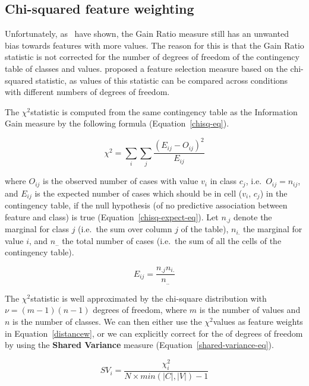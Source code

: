 \documentclass{report}
\newcommand{\chisq}{{$ \chi^2 $}}
\begin{document}
\subsection{Chi-squared feature weighting}
\label{chisquared}

Unfortunately, as~ have shown, the Gain Ratio measure
still has an unwanted bias towards features with more values. The
reason for this is that the Gain Ratio statistic is not corrected for
the number of degrees of freedom of the contingency table of classes
and values.  proposed a feature selection measure based
on the chi-squared statistic, as values of this statistic can be
compared across conditions with different numbers of degrees of
freedom.

The \chisq statistic is computed from the same contingency table as
the Information Gain measure by the following formula
(Equation~\ref{chisq-eq}).

\begin{equation} 
\chi^{2} = \sum_{i} \sum_{j} \frac{(E_{ij} - O_{ij})^{2}}
				  {E_{ij}} 
\label{chisq-eq}
\end{equation} 

where $O_{ij}$ is the observed number of cases with value $v_{i}$ in
class $c_{j}$, i.e.~$O_{ij} = n_{ij}$, and $E_{ij}$ is the expected
number of cases which should be in cell ($v_{i}$, $c_{j}$) in the
contingency table, if the null hypothesis (of no predictive
association between feature and class) is true
(Equation~\ref{chisq-expect-eq}). Let $n_{.j}$ denote the marginal for
class $j$ (i.e.~the sum over column $j$ of the table), $n_{i.}$ the
marginal for value $i$, and $n_{..}$ the total number of cases
(i.e.~the sum of all the cells of the contingency table).

\begin{equation}
E_{ij} = \frac{n_{.j} n_{i.}}{n_{..}}
\label{chisq-expect-eq}
\end{equation}

The \chisq statistic is well approximated by the chi-square
distribution with $\nu = (m-1)(n-1)$ degrees of freedom, where $m$ is
the number of values and $n$ is the number of classes. We can then
either use the \chisq values as feature weights in
Equation~\ref{distancew}, or we can explicitly correct for the of
degrees of freedom by using the {\bf Shared Variance} measure
(Equation~\ref{shared-variance-eq}). 

\begin{equation}
SV_{i} = \frac{ \chi^2_{i}}{N \times min(|C|,|V|)-1}
\label{shared-variance-eq}
\end{equation}
\end{document}
